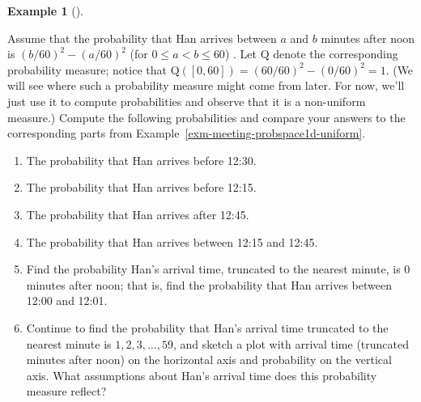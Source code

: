 \documentclass[
  letterpaper,
  DIV=11,
  numbers=noendperiod]{scrreprt}
\providecommand{\tightlist}{%
  \setlength{\itemsep}{0pt}\setlength{\parskip}{0pt}}
\theoremstyle{plain}
\theoremstyle{definition}
\newtheorem{example}{Example}[chapter]
\theoremstyle{definition}
\theoremstyle{definition}
\theoremstyle{remark}
\begin{document}
\begin{tcolorbox}[enhanced jigsaw, opacityback=0, left=2mm, colframe=quarto-callout-note-color-frame, toprule=.15mm, breakable, colback=white, leftrule=.75mm, arc=.35mm, rightrule=.15mm, bottomrule=.15mm]

\begin{example}[]\protect\hypertarget{exm-meeting-nonuniform-probspace1}{}\label{exm-meeting-nonuniform-probspace1}

Assume that the probability that Han arrives between \(a\) and \(b\)
minutes after noon is \((b/60)^2 - (a/60)^2\) (for \(0\le a<b\le 60\)) .
Let \(\textrm{Q}\) denote the corresponding probability measure; notice
that \(\textrm{Q}([0, 60]) = (60/60)^2 - (0/60)^2 = 1\). (We will see
where such a probability measure might come from later. For now, we'll
just use it to compute probabilities and observe that it is a
non-uniform measure.) Compute the following probabilities and compare
your answers to the corresponding parts from
Example~\ref{exm-meeting-probspace1d-uniform}.

\begin{enumerate}
\def\labelenumi{\arabic{enumi}.}
\tightlist
\item
  The probability that Han arrives before 12:30.
\item
  The probability that Han arrives before 12:15.
\item
  The probability that Han arrives after 12:45.
\item
  The probability that Han arrives between 12:15 and 12:45.
\item
  Find the probability Han's arrival time, truncated to the nearest
  minute, is 0 minutes after noon; that is, find the probability that
  Han arrives between 12:00 and 12:01.
\item
  Continue to find the probability that Han's arrival time truncated to
  the nearest minute is \(1, 2, 3, \ldots, 59\), and sketch a plot with
  arrival time (truncated minutes after noon) on the horizontal axis and
  probability on the vertical axis. What assumptions about Han's arrival
  time does this probability measure reflect?
\end{enumerate}

\end{example}

\end{tcolorbox}
\end{document}
